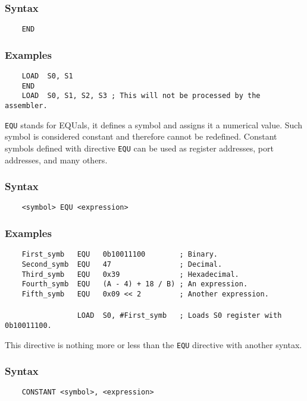         \subsubsection{Syntax}
            \verb'    END'

        \subsubsection{Examples}
            \verb'    LOAD  S0, S1'\\
            \verb'    END'\\
            \verb'    LOAD  S0, S1, S2, S3 ; This will not be processed by the assembler.'

    \clearpage
        \texttt{EQU} stands for EQUals, it defines a symbol and assigns it a numerical value. Such symbol is considered constant and therefore cannot be redefined. Constant symbols defined with directive \texttt{EQU} can be used as register addresses, port addresses, and many others.

        \subsubsection{Syntax}
            \verb'    <symbol> EQU <expression>'

        \subsubsection{Examples}
            \verb'    First_symb   EQU   0b10011100        ; Binary.'\\
            \verb'    Second_symb  EQU   47                ; Decimal.'\\
            \verb'    Third_symb   EQU   0x39              ; Hexadecimal.'\\
            \verb'    Fourth_symb  EQU   (A - 4) + 18 / B) ; An expression.'\\
            \verb'    Fifth_symb   EQU   0x09 << 2         ; Another expression.'\\
            \verb''\\
            \verb'                 LOAD  S0, #First_symb   ; Loads S0 register with 0b10011100.'

        This directive is nothing more or less than the \texttt{EQU} directive with another syntax.

        \subsubsection{Syntax}
            \verb'    CONSTANT <symbol>, <expression>'

